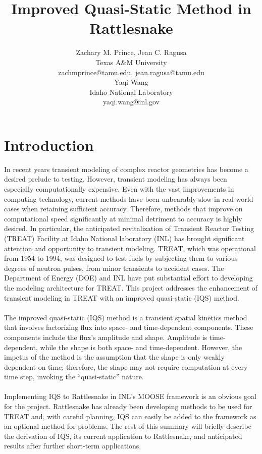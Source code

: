 \documentclass[11pt]{scrartcl}
\title{Improved Quasi-Static Method in Rattlesnake}
\author{ 
{\normalsize Zachary M. Prince, Jean C. Ragusa} \\ 
{\normalsize Texas A\&M University} \\  
{\normalsize zachmprince@tamu.edu, jean.ragusa@tamu.edu} \\ 
{\normalsize Yaqi Wang} \\ 
{\normalsize Idaho National Laboratory} \\  
{\normalsize yaqi.wang@inl.gov}
}
\begin{document}
\maketitle
{}

\section{Introduction}

In recent years transient modeling of complex reactor geometries has become a desired prelude to testing.  However, transient modeling has always been especially computationally expensive. Even with the vast improvements in computing technology, current methods have been unbearably slow in real-world cases when retaining sufficient accuracy.  Therefore, methods that improve on computational speed significantly at minimal detriment to accuracy is highly desired.  In particular, the anticipated revitalization of Transient Reactor Testing (TREAT) Facility at Idaho National laboratory (INL) has brought significant attention and opportunity to transient modeling.  TREAT, which was operational from 1954 to 1994, was designed to test fuels by subjecting them to various degrees of neutron pulses, from minor transients to accident cases.  The Department of Energy (DOE) and INL have put substantial effort to developing the modeling architecture for TREAT.  This project addresses the enhancement of transient modeling in TREAT with an improved quasi-static (IQS) method.
\\ \\
The improved quasi-static (IQS) method is a transient spatial kinetics method that involves factorizing flux into space- and time-dependent components.  These components include the flux’s amplitude and shape. Amplitude is time-dependent, while the shape is both space- and time-dependent.  However, the impetus of the method is the assumption that the shape is only weakly dependent on time; therefore, the shape may not require computation at every time step, invoking the “quasi-static” nature.
\\ \\
Implementing IQS to Rattlesnake in INL’s MOOSE framework is an obvious goal for the project.  Rattlesnake has already been developing methods to be used for TREAT and, with careful planning, IQS can easily be added to the framework as an optional method for problems.  The rest of this summary will briefly describe the derivation of IQS, its current application to Rattlesnake, and anticipated results after further short-term applications.
\end{document}
